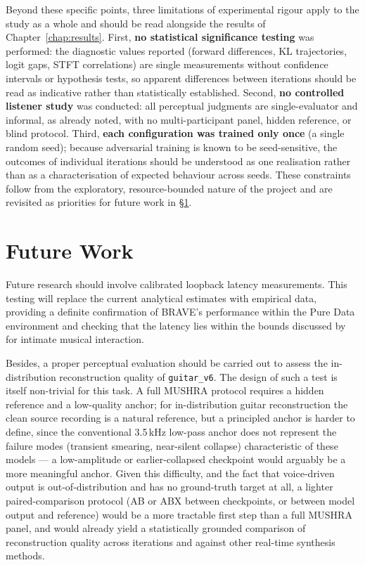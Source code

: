 \documentclass[a4paper,11pt,oneside,openany]{book}
\begin{document}
Beyond these specific points, three limitations of experimental rigour apply to the study as a whole and should be read alongside the results of Chapter~\ref{chap:results}. First, \textbf{no statistical significance testing} was performed: the diagnostic values reported (forward differences, KL trajectories, logit gaps, STFT correlations) are single measurements without confidence intervals or hypothesis tests, so apparent differences between iterations should be read as indicative rather than statistically established. Second, \textbf{no controlled listener study} was conducted: all perceptual judgments are single-evaluator and informal, as already noted, with no multi-participant panel, hidden reference, or blind protocol. Third, \textbf{each configuration was trained only once} (a single random seed); because adversarial training is known to be seed-sensitive, the outcomes of individual iterations should be understood as one realisation rather than as a characterisation of expected behaviour across seeds. These constraints follow from the exploratory, resource-bounded nature of the project and are revisited as priorities for future work in \S\ref{sec:future_work}.

\section{Future Work}\label{sec:future_work}

Future research should involve calibrated loopback latency measurements. This testing will replace the current analytical estimates with empirical data, providing a definite confirmation of BRAVE's performance within the Pure Data environment and checking that the latency lies within the bounds discussed by \textcite{wessel2002intimate} for intimate musical interaction.

Besides, a proper perceptual evaluation should be carried out to assess the in-distribution reconstruction quality of \texttt{guitar\_v6}. The design of such a test is itself non-trivial for this task. A full MUSHRA protocol requires a hidden reference and a low-quality anchor; for in-distribution guitar reconstruction the clean source recording is a natural reference, but a principled anchor is harder to define, since the conventional 3.5\,kHz low-pass anchor does not represent the failure modes (transient smearing, near-silent collapse) characteristic of these models --- a low-amplitude or earlier-collapsed checkpoint would arguably be a more meaningful anchor. Given this difficulty, and the fact that voice-driven output is out-of-distribution and has no ground-truth target at all, a lighter paired-comparison protocol (AB or ABX between checkpoints, or between model output and reference) would be a more tractable first step than a full MUSHRA panel, and would already yield a statistically grounded comparison of reconstruction quality across iterations and against other real-time synthesis methods.
\end{document}
